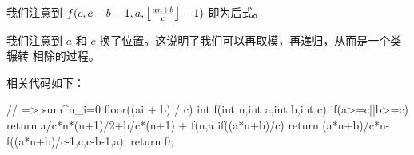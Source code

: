 我们注意到 $f(c, c - b - 1, a, \left\lfloor{an + b \over c}\right\rfloor - 1)$
即为后式。

我们注意到 $a$ 和 $c$ 换了位置。这说明了我们可以再取模，再递归，从而是一个类辗转
相除的过程。

相关代码如下：
\begin{Cpp}
// => sum^n_{i=0} floor((ai + b) / c)
int f(int n,int a,int b,int c){
  if(a>=c||b>=c)
    return a/c*n*(n+1)/2+b/c*(n+1)
            + f(n,a%
  if((a*n+b)/c)
    return (a*n+b)/c*n-f((a*n+b)/c-1,c,c-b-1,a);
  return 0;
}
\end{Cpp}

